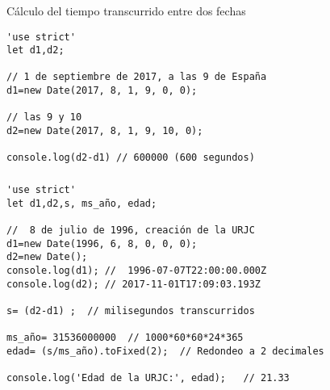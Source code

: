 \documentclass[ucs]{beamer}
\begin{document}
\begin{frame}[fragile]
\frametitle{}
Cálculo del tiempo transcurrido entre dos fechas

  \begin{scriptsize}
  \begin{verbatim}
'use strict'
let d1,d2;

// 1 de septiembre de 2017, a las 9 de España
d1=new Date(2017, 8, 1, 9, 0, 0);

// las 9 y 10
d2=new Date(2017, 8, 1, 9, 10, 0);

console.log(d2-d1) // 600000 (600 segundos)
  \end{verbatim}
  \end{scriptsize}
\end{frame}

\begin{frame}[fragile]
\frametitle{}
  \begin{scriptsize}
  \begin{verbatim}
'use strict'
let d1,d2,s, ms_año, edad;

//  8 de julio de 1996, creación de la URJC
d1=new Date(1996, 6, 8, 0, 0, 0);
d2=new Date();
console.log(d1); //  1996-07-07T22:00:00.000Z
console.log(d2); // 2017-11-01T17:09:03.193Z

s= (d2-d1) ;  // milisegundos transcurridos

ms_año= 31536000000  // 1000*60*60*24*365
edad= (s/ms_año).toFixed(2);  // Redondeo a 2 decimales

console.log('Edad de la URJC:', edad);   // 21.33
  \end{verbatim}
  \end{scriptsize}
\end{frame}
\end{document}
